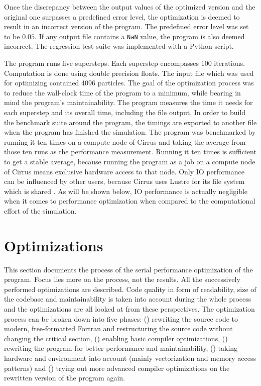 \documentclass[twoside,11pt]{article}
\begin{document}
Once the discrepancy between the output values of the optimized
version and the original one surpasses a predefined error level,
the optimization is deemed to result in an incorrect version of the
program.
The predefined error level was set to be $0.05$.
If any output file contains a \texttt{NaN} value, the program is
also deemed incorrect.
The regression test suite was implemented with a Python script.

The program runs five supersteps.
Each superstep encompasses 100 iterations.
Computation is done using double precision floats.
The input file which was used for optimizing contained 4096 particles.
The goal of the optimization process was to reduce the wall-clock
time of the program to a minimum, while bearing in mind
the program's maintainability.
The program measures the time it needs for each superstep and its
overall time, including the file output.
In order to build the benchmark suite around the program, the timings
are exported to another file when the program has finished the
simulation.
The program was benchmarked by running it ten times on a compute node
of Cirrus and taking the average from those ten runs as the
performance measurement.
Running it ten times is sufficient to get a stable average,
because running the program as a job on a compute node of Cirrus
means exclusive hardware access to that node.
Only IO performance can be influenced by other users, because Cirrus
uses Lustre for its file system which is shared
\citep{cirrus_hardware}.
As will be shown below, IO performance is actually negligible when
it comes to performance optimization when compared to the
computational effort of the simulation.


\section{Optimizations} %
\label{sec:opt}

This section documents the process of the serial performance
optimization of the program.
Focus lies more on the process, not the results.
All the successively performed optimizations are described.
Code quality in form of readability, size of the codebase and
maintainability is taken into account during the whole process and the
optimizations are all looked at from these perspectives.
The optimization process can be broken down into five phases:
() rewriting the source code to modern, free-formatted
Fortran and restructuring the source code without changing the
critical section, () enabling basic compiler
optimizations, () rewriting the program for better
performance and maintainability, () taking hardware and
environment into account (mainly vectorization and memory access
patterns) and () trying out more advanced compiler
optimizations on the rewritten version of the program again.
\end{document}
